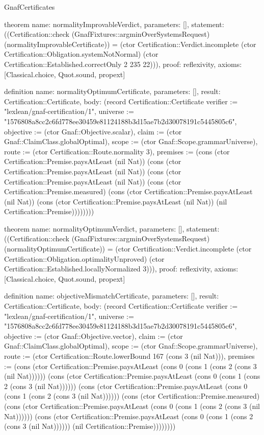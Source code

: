 \begin{lexlean}{GnafCertificates}
\begin{semanticmodule}
theorem{
  name: normalityImprovableVerdict,
  parameters: [],
  statement: ((Certification::check (GnafFixtures::argminOverSystemsRequest) (normalityImprovableCertificate)) = (ctor Certification::Verdict.incomplete (ctor Certification::Obligation.systemNotNormal) (ctor Certification::Established.correctOnly 2 235 22))),
  proof: reflexivity{},
  axioms: [Classical.choice, Quot.sound, propext]
}

definition{
  name: normalityOptimumCertificate,
  parameters: [],
  result: Certification::Certificate,
  body: (record Certification::Certificate {verifier := "lexlean/gnaf-certification/1", universe := "1576808a8cc2c6fd778ee30459e81124188b3d15ae7b2d30078191c5445805c6", objective := (ctor Gnaf::Objective.scalar), claim := (ctor Gnaf::ClaimClass.globalOptimal), scope := (ctor Gnaf::Scope.grammarUniverse), route := (ctor Certification::Route.normality 3), premises := (cons (ctor Certification::Premise.paysAtLeast (nil Nat)) (cons (ctor Certification::Premise.paysAtLeast (nil Nat)) (cons (ctor Certification::Premise.paysAtLeast (nil Nat)) (cons (ctor Certification::Premise.measured) (cons (ctor Certification::Premise.paysAtLeast (nil Nat)) (cons (ctor Certification::Premise.paysAtLeast (nil Nat)) (nil Certification::Premise)))))))})
}

theorem{
  name: normalityOptimumVerdict,
  parameters: [],
  statement: ((Certification::check (GnafFixtures::argminOverSystemsRequest) (normalityOptimumCertificate)) = (ctor Certification::Verdict.incomplete (ctor Certification::Obligation.optimalityUnproved) (ctor Certification::Established.locallyNormalized 3))),
  proof: reflexivity{},
  axioms: [Classical.choice, Quot.sound, propext]
}

definition{
  name: objectiveMismatchCertificate,
  parameters: [],
  result: Certification::Certificate,
  body: (record Certification::Certificate {verifier := "lexlean/gnaf-certification/1", universe := "1576808a8cc2c6fd778ee30459e81124188b3d15ae7b2d30078191c5445805c6", objective := (ctor Gnaf::Objective.vector), claim := (ctor Gnaf::ClaimClass.globalOptimal), scope := (ctor Gnaf::Scope.grammarUniverse), route := (ctor Certification::Route.lowerBound 167 (cons 3 (nil Nat))), premises := (cons (ctor Certification::Premise.paysAtLeast (cons 0 (cons 1 (cons 2 (cons 3 (nil Nat)))))) (cons (ctor Certification::Premise.paysAtLeast (cons 0 (cons 1 (cons 2 (cons 3 (nil Nat)))))) (cons (ctor Certification::Premise.paysAtLeast (cons 0 (cons 1 (cons 2 (cons 3 (nil Nat)))))) (cons (ctor Certification::Premise.measured) (cons (ctor Certification::Premise.paysAtLeast (cons 0 (cons 1 (cons 2 (cons 3 (nil Nat)))))) (cons (ctor Certification::Premise.paysAtLeast (cons 0 (cons 1 (cons 2 (cons 3 (nil Nat)))))) (nil Certification::Premise)))))))})
}


\end{semanticmodule}
\end{lexlean}
